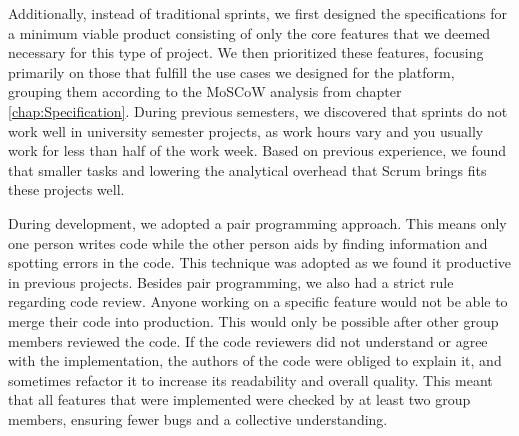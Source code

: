 Additionally, instead of traditional sprints, we first designed the specifications for a minimum viable product consisting of only the core features that we deemed necessary for this type of project.
We then prioritized these features, focusing primarily on those that fulfill the use cases we designed for the platform, grouping them according to the MoSCoW analysis from chapter \ref{chap:Specification}.
During previous semesters, we discovered that sprints do not work well in university semester projects, as work hours vary and you usually work for less than half of the work week.
Based on previous experience, we found that smaller tasks and lowering the analytical overhead that Scrum brings fits these projects well.

During development, we adopted a pair programming approach. This means only one person writes code while the other person aids by finding information and spotting errors in the code. This technique was adopted as we found it productive in previous projects.
Besides pair programming, we also had a strict rule regarding code review. Anyone working on a specific feature would not be able to merge their code into production. This would only be possible after other group members reviewed the code.
If the code reviewers did not understand or agree with the implementation, the authors of the code were obliged to explain it, and sometimes refactor it to increase its readability and overall quality.
This meant that all features that were implemented were checked by at least two group members, ensuring fewer bugs and a collective understanding.
